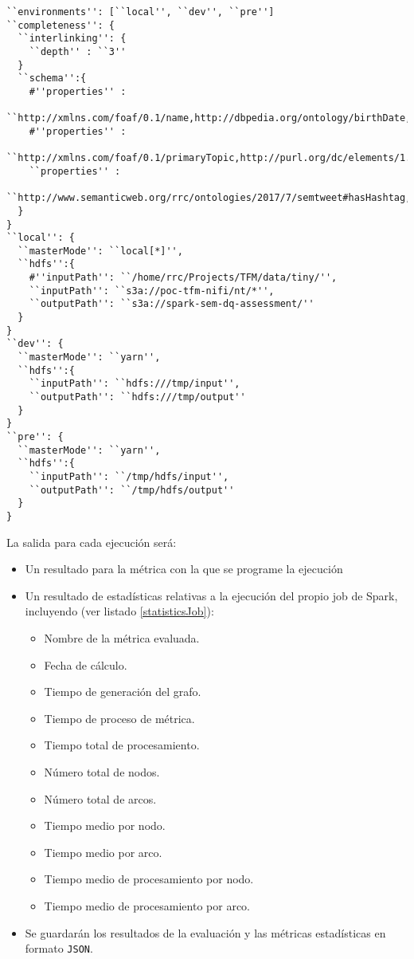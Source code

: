 \lstset{escapechar=@,language=bash}
\begin{lstlisting}[caption={Archivo de configuración del job},captionpos=b,
    label=application.conf]
``environments'': [``local'', ``dev'', ``pre'']
``completeness'': {
  ``interlinking'': {
    ``depth'' : ``3''
  }
  ``schema'':{
    #''properties'' :
      ``http://xmlns.com/foaf/0.1/name,http://dbpedia.org/ontology/birthDate,http://xmlns.com/foaf/0.1/givenName''
    #''properties'' :
      ``http://xmlns.com/foaf/0.1/primaryTopic,http://purl.org/dc/elements/1.1/language''
    ``properties'' :
      ``http://www.semanticweb.org/rrc/ontologies/2017/7/semtweet#hasHashtag,http://www.semanticweb.org/rrc/ontologies/2017/7/semtweet#hasUser''
  }
}
``local'': {
  ``masterMode'': ``local[*]'',
  ``hdfs'':{
    #''inputPath'': ``/home/rrc/Projects/TFM/data/tiny/'',
    ``inputPath'': ``s3a://poc-tfm-nifi/nt/*'',
    ``outputPath'': ``s3a://spark-sem-dq-assessment/''
  }
}
``dev'': {
  ``masterMode'': ``yarn'',
  ``hdfs'':{
    ``inputPath'': ``hdfs:///tmp/input'',
    ``outputPath'': ``hdfs:///tmp/output''
  }
}
``pre'': {
  ``masterMode'': ``yarn'',
  ``hdfs'':{
    ``inputPath'': ``/tmp/hdfs/input'',
    ``outputPath'': ``/tmp/hdfs/output''
  }
}
\end{lstlisting}


La salida para cada ejecución será:

\begin{itemize}
\item Un resultado para la métrica con la que se programe la ejecución
\item Un resultado de estadísticas relativas a la ejecución del propio job de
  Spark, incluyendo (ver listado \ref{statisticsJob}): 
  \begin{itemize}
  \item Nombre de la métrica evaluada.
  \item Fecha de cálculo.
  \item Tiempo de generación del grafo.
  \item Tiempo de proceso de métrica.
  \item Tiempo total de procesamiento.
  \item Número total de nodos.
  \item Número total de arcos.
  \item Tiempo medio por nodo.
  \item Tiempo medio por arco.
  \item Tiempo medio de procesamiento por nodo.
  \item Tiempo medio de procesamiento por arco.
  \end{itemize}
\item Se guardarán los resultados de la evaluación y las métricas estadísticas
  en formato \texttt{\acs{JSON}}. 

\end{itemize}

